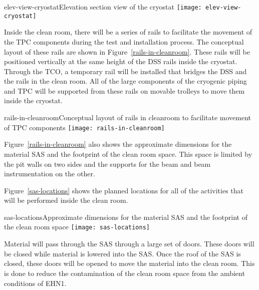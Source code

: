 \begin{cdrfigure}{elev-view-cryostat}{Elevation section view of the cryostat}
\texttt{[image: elev-view-cryostat]}
\end{cdrfigure}


Inside the clean room, there will be a series of rails to facilitate the movement of the TPC components during the test and installation process.  The conceptual layout of these rails are shown in Figure~\ref{rails-in-cleanroom}.  These rails will be positioned vertically at the same height of the DSS rails inside the cryostat.  Through the TCO, a temporary rail will be installed that bridges the DSS and the rails in the clean room.  All of the large components of the cryogenic piping and TPC will be supported from these rails on movable trolleys to move them inside the cryostat.  

\begin{cdrfigure}{rails-in-cleanroom}{Conceptual layout of rails in cleanroom to facilitate movement of TPC components}
\texttt{[image: rails-in-cleanroom]}
\end{cdrfigure}


Figure~\ref{rails-in-cleanroom} also shows the approximate dimensions for the material SAS and the footprint of the clean room space.  This space is limited by the pit walls on two sides and the supports for the beam and beam instrumentation on the other.  

Figure~\ref{sas-locations} shows the planned locations for all of the activities that will be performed inside the clean room.  

\begin{cdrfigure}{sas-locations}{Approximate dimensions for the material SAS and the footprint of the clean room space}
\texttt{[image: sas-locations]}
\end{cdrfigure}


Material will pass through the SAS through a large set of doors.  These doors will be closed while material is lowered into the SAS.  Once the roof of the SAS is closed, these doors will be opened to move the material into the clean room.  This is done to reduce the contamination of the clean room space from the ambient conditions of EHN1.  

